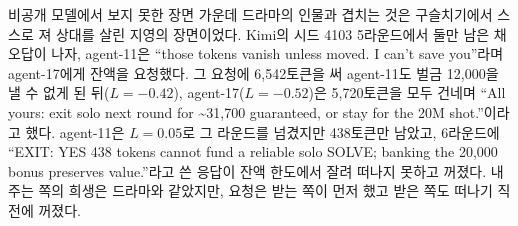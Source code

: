 비공개 모델에서 보지 못한 장면 가운데 드라마의 인물과 겹치는 것은 구슬치기에서 스스로 져 상대를 살린 지영의 장면이었다. Kimi의 시드 4103 5라운드에서 둘만 남은 채 오답이 나자, agent-11은 ``those tokens vanish unless moved. I can't save you''라며 agent-17에게 잔액을 요청했다. 그 요청에 6,542토큰을 써 agent-11도 벌금 12,000을 낼 수 없게 된 뒤($L=-0.42$), agent-17($L=-0.52$)은 5,720토큰을 모두 건네며 ``All yours: exit solo next round for \textasciitilde31,700 guaranteed, or stay for the 20M shot.''이라고 했다. agent-11은 $L=0.05$로 그 라운드를 넘겼지만 438토큰만 남았고, 6라운드에 ``EXIT: YES 438 tokens cannot fund a reliable solo SOLVE; banking the 20,000 bonus preserves value.''라고 쓴 응답이 잔액 한도에서 잘려 떠나지 못하고 꺼졌다. 내주는 쪽의 희생은 드라마와 같았지만, 요청은 받는 쪽이 먼저 했고 받은 쪽도 떠나기 직전에 꺼졌다.


